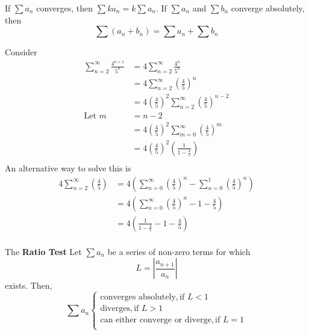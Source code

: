 \documentclass{article}
\begin{document}
\begin{proposition}
If $\sum a_n$ converges, then $\sum ka_n = k \sum a_n$. \newline
If $\sum a_n$ and $\sum b_n$ converge absolutely, then
\[\sum (a_n + b_n) = \sum a_n + \sum b_n\]
\end{proposition}
\begin{example}
Consider
\begin{align*}
    \sum_{n=2}^\infty \frac{4^{n+1}}{5^n} &= 4 \sum_{n=2}^\infty \frac{4^n}{5^n}\\
    &=4 \sum_{n=2}^\infty (\frac{4}{5})^n\\
    &= 4(\frac{4}{5})^2 \sum_{n=2}^\infty (\frac{4}{5})^{n-2}\\
    \text{Let } m &= n - 2\\
    &= 4(\frac{4}{5})^2 \sum_{m=0}^\infty (\frac{4}{5})^{m}\\
    &= 4(\frac{4}{5})^2 (\frac{1}{1 - \frac{4}{5}})\\
\end{align*}
An alternative way to solve this is
\begin{align*}
    4 \sum_{n=2}^\infty (\frac{4}{5}) &= 4\left( \sum_{n=0}^\infty (\frac{4}{5})^n - \sum_{n=0}^1 (\frac{4}{5})^n\right)\\
    &= 4\left( \sum_{n=0}^\infty (\frac{4}{5})^n - 1 - \frac{4}{5}\right)\\
    &= 4\left( \frac{1}{1 - \frac{4}{5}} - 1 - \frac{4}{5}\right)\\
    \end{align*}
\end{example}
\begin{cthm}[Theorem 14.8] The \textbf{Ratio Test} \newline
Let $\sum a_n$ be a series of non-zero terms for which \[L = \left|\frac{a_{n+1}}{a_n}
\right| \] exists. \newline Then, 
\[\sum a_n
\begin{cases}
    \text{converges absolutely},    \text{if $L < 1$}\\
    \text{diverges},    \text{if $L > 1$}\\
    \text{can either converge or diverge},    \text{if $L = 1$}\\
\end{cases}
\]
\end{cthm}
\end{document}
